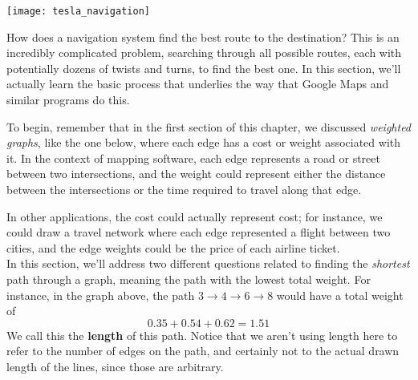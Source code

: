 \setcounter{ExampleCounter}{1}
\begin{center}
\texttt{[image: tesla\_navigation]}
\end{center}
How does a navigation system find the best route to the destination?  This is an incredibly complicated problem, searching through all possible routes, each with potentially dozens of twists and turns, to find the best one.  In this section, we'll actually learn the basic process that underlies the way that Google Maps and similar programs do this.

To begin, remember that in the first section of this chapter, we discussed \emph{weighted graphs}, like the one below, where each edge has a cost or weight associated with it.  In the context of mapping software, each edge represents a road or street between two intersections, and the weight could represent either the distance between the intersections or the time required to travel along that edge.
\begin{center}
\end{center}

In other applications, the cost could actually represent cost; for instance, we could draw a travel network where each edge represented a flight between two cities, and the edge weights could be the price of each airline ticket.\\

In this section, we'll address two different questions related to finding the \emph{shortest} path through a graph, meaning the path with the lowest total weight.  For instance, in the graph above, the path $3 \to 4 \to 6 \to 8$ would have a total weight of
\[0.35 + 0.54 + 0.62 = 1.51\]
We call this the \textbf{length} of this path.  Notice that we aren't using length here to refer to the number of edges on the path, and certainly not to the actual drawn length of the lines, since those are arbitrary.

